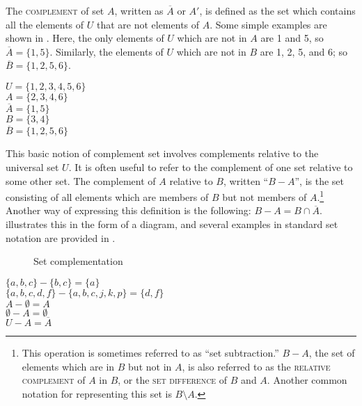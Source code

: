 The \textsc{complement} of set $A$, written as $\overline{A}$ or $A'$, is defined as the set which contains all the elements of $U$ that are not elements of $A$. Some simple examples are shown in . Here, the only elements of $U$ which are not in $A$ are 1 and 5, so
$\overline{A} = \{1,5\}$. Similarly, the elements of $U$ which are not in $B$ are 1, 2, 5, and 6; so $\overline{B} = \{1,2,5,6\}$.


\ea \label{ex:13.17}
$U = \{1,2,3,4,5,6\}$\\
$A = \{2,3,4,6\}$\\
$\overline{A} = \{1,5\}$\\
$B = \{3,4\}$\\
$\overline{B} = \{1,2,5,6\}$
\z


This basic notion of complement set involves complements relative to the universal set $U$. It is often useful to refer to the complement of one set relative to some other set. The complement of $A$ relative to $B$, written “$B-A$”, is the set consisting of all elements which are members of $B$ but not members of $A$.\footnote{This operation is sometimes referred to as “set subtraction.” $B - A$, the set of elements which are in $B$ but not in $A$, is also referred to as the \textsc{relative complement} of $A$ in $B$, or the \textsc{set difference} of $B$ and $A$. Another common notation for representing this set is $B\setminus A$.} Another way of expressing this definition is the following: $B-A = B\cap\overline{A}$.  illustrates this in the form of a diagram, and several examples in standard set notation are provided in .

\begin{figure}
\caption{\label{fig:13:4} Set complementation}
\end{figure}

\ea \label{ex:13.18}
$\{a,b,c\} - \{b,c\} = \{a\}$\\
$\{a,b,c,d,f\} - \{a,b,c,j,k,p\} = \{d,f\}$\\
$A - ∅ = A$\\
$∅ - A = ∅$\\
$U - A = \overline{A}$
\z


